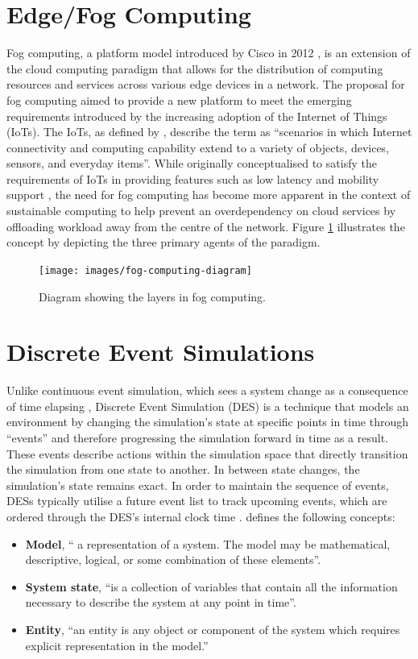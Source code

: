 \documentclass{l4proj}
\begin{document}
\section{Edge/Fog Computing}
Fog computing, a platform model introduced by Cisco in 2012 \citep{fog_computing}, is an extension of the cloud computing paradigm that allows for the distribution of computing resources and services across various edge devices in a network.
The proposal for fog computing aimed to provide a new platform to meet the emerging requirements introduced by the increasing adoption of the Internet of Things (IoTs).
The IoTs, as defined by \cite{iot}, describe the term as ``scenarios in which Internet connectivity and computing capability extend to a variety of objects, devices, sensors, and everyday items''.
While originally conceptualised to satisfy the requirements of IoTs in providing features such as low latency and mobility support \citep{fog_computing}, the need for fog computing has become more apparent in the context of sustainable computing to help prevent an overdependency on cloud services by offloading workload away from the centre of the network.
Figure \ref{fig:fog-diagram} illustrates the concept by depicting the three primary agents of the paradigm.
\begin{figure}[h]
    \centering
    \texttt{[image: images/fog-computing-diagram]}
    ~
    \caption{Diagram showing the layers in fog computing.}
    \label{fig:fog-diagram}
\end{figure}

\section{Discrete Event Simulations}

Unlike continuous event simulation, which sees a system change as a consequence of time elapsing \cite{simpy}, Discrete Event Simulation (DES) is a technique that models an environment by changing the simulation's state at specific points in time through ``events'' and therefore progressing the simulation forward in time as a result.
These events describe actions within the simulation space that directly transition the simulation from one state to another.
In between state changes, the simulation's state remains exact.
In order to maintain the sequence of events, DESs typically utilise a future event list to track upcoming events, which are ordered through the DES's internal clock time \citep{Des}.
\cite{des-old} defines the following concepts:
\begin{itemize}
	\item \textbf{Model}, `` a representation of a system. The model may be mathematical, descriptive, logical, or some combination of these elements''.
	\item \textbf{System state}, ``is a collection of variables that contain all the information necessary to describe the system at any point in time''.
	\item \textbf{Entity}, ``an entity is any object or component of the system which requires explicit representation in the model.''
\end{itemize}
\end{document}
